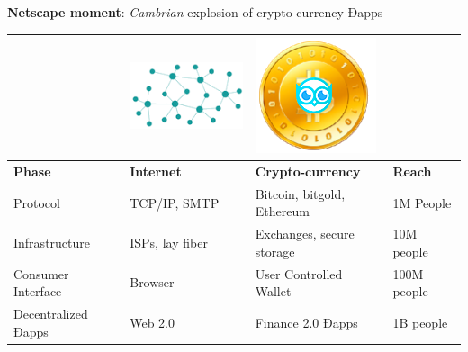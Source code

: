 \textbf{Netscape moment}: \emph{Cambrian} explosion of crypto-currency Ðapps
 
\centering

 \begin{adjustbox}{width=1\textwidth}
\begin{tabularx} {\textwidth}{|X|X|X|X|}
    \hline
&    \includegraphics[scale=0.3]{static/decentnew} &     \includegraphics[scale=0.3]{static/hootcoin} & \\
    \hline
\textbf{Phase} & \textbf{Internet} & \textbf{Crypto-currency} & \textbf{Reach}\\
\hline
Protocol & TCP/IP, SMTP & Bitcoin, bitgold, Ethereum & 1M People \\
\hline
Infrastructure & ISPs, lay fiber & Exchanges, secure storage & 10M people \\
\hline
Consumer Interface & Browser & User Controlled Wallet & 100M people \\
\hline
Decentralized Ðapps &  Web 2.0  & Finance 2.0 Ðapps & 1B people\\
\hline
\end{tabularx}
\end{adjustbox}